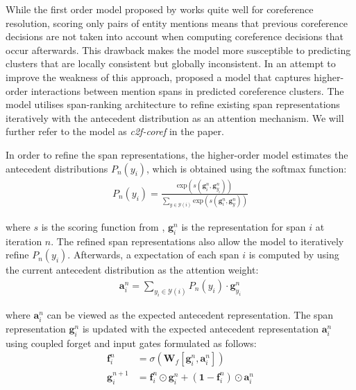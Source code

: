 \documentclass[11pt]{article}
\begin{document}
While the first order model proposed by \textcite{lee2017end} works quite well for coreference resolution, scoring only pairs of entity mentions means that previous coreference decisions are not taken into account when computing coreference decisions that occur afterwards. This drawback makes the model more susceptible to predicting clusters that are locally consistent but globally inconsistent. In an attempt to improve the weakness of this approach, \textcite{lee2018higher} proposed a model that captures higher-order interactions between mention spans in predicted coreference clusters. The model utilises span-ranking architecture to refine existing span representations iteratively with the antecedent distribution as an attention mechanism. We will further refer to the model as \textit{c2f-coref} in the paper.

In order to refine the span representations, the higher-order model estimates the antecedent distributions $P_{n}(y_{i})$, which is obtained using the softmax function:
\begin{align}
P_{n}(y_{i}) = \frac{\text{exp}(s(\pmb{g}_{i}^{n}, \pmb{g}_{y_{i}}^{n}))}{\sum_{y \in \mathcal{Y}(i)} \text{exp}(s(\pmb{g}_{i}^{n}, \pmb{g}_{y}^{n}))}
\end{align}

where $s$ is the scoring function from \textcite{lee2017end}, $\pmb{g}_{i}^{n}$ is the representation for span $i$ at iteration $n$. The refined span representations also allow the model to iteratively refine $P_{n}(y_{i})$. Afterwards, a expectation of each span $i$ is computed by using the current antecedent distribution as the attention weight:
\begin{align}
\pmb{a}_{i}^{n} = \sum\limits_{y_{i} \in \mathcal{Y}(i)} P_{n}(y_{i}) \cdot \pmb{g}_{y_{i}}^{n}
\end{align}

where $\pmb{a}_{i}^{n}$ can be viewed as the expected antecedent representation. The span representation $\pmb{g}_{i}^{n}$ is updated with the expected antecedent representation $\pmb{a}_{i}^{n}$ using coupled forget and input gates formulated as follows:
\begin{align}
\pmb{f}_{i}^{n} &= \sigma(\textbf{W}_{f}[\pmb{g}_{i}^{n}, \pmb{a}_{i}^{n}]) \\
\pmb{g}_{i}^{n+1} &= \pmb{f}_{i}^{n} \odot \pmb{g}_{i}^{n} + (\mathbf{1} - \pmb{f}_{i}^{n}) \odot \pmb{a}_{i}^{n}
\end{align}
\end{document}
